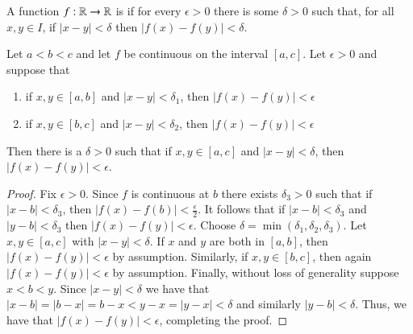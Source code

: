 \documentclass[12pt, a4paper, oneside, openright, titlepage]{book}
\begin{document}
\begin{defn}
    A function $f:\mathbb R\rightarrow \mathbb R$ is  if for every $\epsilon > 0$ there is some $\delta > 0$ such that, for all $x,y \in I$, if $|x-y| < \delta$ then $|f(x) - f(y)| < \delta$.
\end{defn}


\begin{lem}
    Let $a < b < c$ and let $f$ be continuous on the interval $[a,c]$. Let $\epsilon > 0$ and suppose that \begin{enumerate}
        \item if $x,y \in [a,b]$ and $|x-y| < \delta_1$, then $|f(x) - f(y)| < \epsilon$
        \item if $x,y \in [b,c]$ and $|x-y| < \delta_2$, then $|f(x) - f(y)| < \epsilon$
    \end{enumerate}
    Then there is a $\delta > 0$ such that if $x,y \in [a,c]$ and $|x-y| < \delta$, then $|f(x) - f(y)| < \epsilon$.
\end{lem}
\begin{proof}
    Fix $\epsilon > 0$. Since $f$ is continuous at $b$ there exists $\delta_3 > 0$ such that if $|x-b| < \delta_3$, then $|f(x) - f(b)| < \frac{\epsilon}{2}$. It follows that if $|x-b| < \delta_3$ and $|y-b| < \delta_3$ then $|f(x) - f(y)| < \epsilon$. Choose $\delta = \min(\delta_1,\delta_2,\delta_3)$. Let $x,y \in [a,c]$ with $|x-y| < \delta$. If $x$ and $y$ are both in $[a,b]$, then $|f(x) - f(y)| < \epsilon$ by assumption. Similarly, if $x,y \in [b,c]$, then again $|f(x) - f(y)| < \epsilon$ by assumption. Finally, without loss of generality suppose $x < b < y$. Since $|x-y| < \delta$ we have that $|x-b| = |b-x| = b-x < y-x = |y-x| < \delta$ and similarly $|y-b| < \delta$. Thus, we have that $|f(x) - f(y)| < \epsilon$, completing the proof.
\end{proof}
\end{document}
